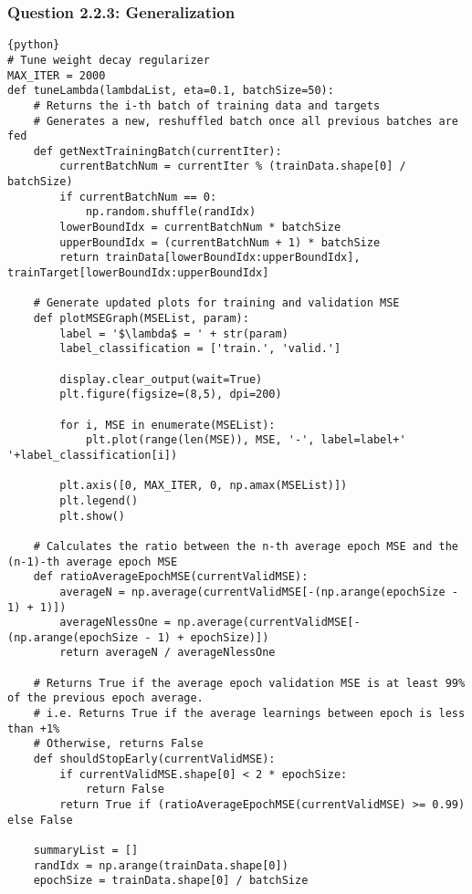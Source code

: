 \documentclass[a4paper,12pt]{article}
\begin{document}
\subsubsection{Question 2.2.3: Generalization}
\begin{verbatim}
{python}
# Tune weight decay regularizer
MAX_ITER = 2000
def tuneLambda(lambdaList, eta=0.1, batchSize=50):
    # Returns the i-th batch of training data and targets
    # Generates a new, reshuffled batch once all previous batches are fed
    def getNextTrainingBatch(currentIter):
        currentBatchNum = currentIter % (trainData.shape[0] / batchSize)
        if currentBatchNum == 0:
            np.random.shuffle(randIdx)
        lowerBoundIdx = currentBatchNum * batchSize
        upperBoundIdx = (currentBatchNum + 1) * batchSize 
        return trainData[lowerBoundIdx:upperBoundIdx], trainTarget[lowerBoundIdx:upperBoundIdx]
    
    # Generate updated plots for training and validation MSE
    def plotMSEGraph(MSEList, param):
        label = '$\lambda$ = ' + str(param)
        label_classification = ['train.', 'valid.']

        display.clear_output(wait=True)
        plt.figure(figsize=(8,5), dpi=200)
        
        for i, MSE in enumerate(MSEList):
            plt.plot(range(len(MSE)), MSE, '-', label=label+' '+label_classification[i])
        
        plt.axis([0, MAX_ITER, 0, np.amax(MSEList)])
        plt.legend()
        plt.show()
    
    # Calculates the ratio between the n-th average epoch MSE and the (n-1)-th average epoch MSE
    def ratioAverageEpochMSE(currentValidMSE):
        averageN = np.average(currentValidMSE[-(np.arange(epochSize - 1) + 1)])
        averageNlessOne = np.average(currentValidMSE[-(np.arange(epochSize - 1) + epochSize)])
        return averageN / averageNlessOne
    
    # Returns True if the average epoch validation MSE is at least 99% of the previous epoch average.
    # i.e. Returns True if the average learnings between epoch is less than +1%
    # Otherwise, returns False
    def shouldStopEarly(currentValidMSE):
        if currentValidMSE.shape[0] < 2 * epochSize:
            return False
        return True if (ratioAverageEpochMSE(currentValidMSE) >= 0.99) else False
    
    summaryList = []
    randIdx = np.arange(trainData.shape[0])
    epochSize = trainData.shape[0] / batchSize
    

\end{verbatim}
\end{document}
